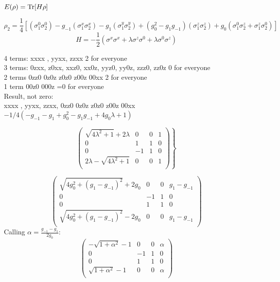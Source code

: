 \documentclass[12pt,a4paper]{book}
\theoremstyle{definition}
\begin{document}
$E(\rho)=\Tr[H \rho]$

\begin{equation}
	\rho_2=\frac{1}{4} [ ( \sigma_1^0 \sigma_2^0 ) -g_{-1} \left(\sigma_1^x \sigma_2^x\right) - g_{1} \left(\sigma_1^y \sigma_2^y\right) + (g_{0}^2-g_1g_{-1}) \left(\sigma_1^z \sigma_2^z\right)+g_0\left(\sigma_1^0 \sigma_2^z+\sigma_1^z \sigma_2^0\right) ] 
\end{equation}
\begin{equation}
	H=-\frac{1}{2} \left(\sigma^{x} \sigma^{x}+\lambda\sigma^{z} \sigma^0+\lambda\sigma^0\sigma^{z}\right) 
\end{equation}

4 terms: xxxx , yyxx, zzxx  2 for everyone \\

3 terms: 0zxx, z0xx, xxz0, xx0z, yyz0, yy0z, zzz0, zz0z  0 for everyone\\

2 terms 0zz0 0z0z z0z0 z00z 00xx  2 for everyone\\

1 term 00z0 000z =0 for everyone \\

Result, not zero:\\
xxxx , yyxx, zzxx, 0zz0 0z0z z0z0 z00z 00xx \\
$-1/4(-g_{-1}-g_1+ g_{0}^2-g_1g_{-1}+ 4g_0 \lambda + 1)$





\begin{equation}
	\left.\left(
	\begin{array}{cccc}
		\sqrt{4 \lambda ^2+1}+2 \lambda  & 0 & 0 & 1 \\
		0 & 1 & 1 & 0 \\
		0 & -1 & 1 & 0 \\
		2 \lambda -\sqrt{4 \lambda ^2+1} & 0 & 0 & 1 \\
	\end{array}
	\right)\right\}
\end{equation}


\begin{equation}
	\left(
	\begin{array}{cccc}
		\sqrt{4 g_0^2+(g_1-g_{-1})^2}+2 g_0 & 0 & 0 & g_1-g_{-1}  \\
		0 & -1 & 1 & 0 \\
		0 & 1 & 1 & 0 \\
		\sqrt{4 g_0^2+(g_1-g_{-1})^2}-2 g_0 & 0 & 0 & g_1-g_{-1} \\
	\end{array}
	\right)
\end{equation}
Calling $\alpha=\frac{g_{-1}-g_1}{2g_0}$:
\begin{equation}
	\left(
	\begin{array}{cccc}
		-\sqrt{1+\alpha^2}-1 & 0 & 0 & \alpha \\
		0 & -1 & 1 & 0 \\
		0 & 1 & 1 & 0 \\
		\sqrt{1+\alpha^2}-1 & 0 & 0 & \alpha \\
	\end{array}
	\right)
\end{equation}
\end{document}
